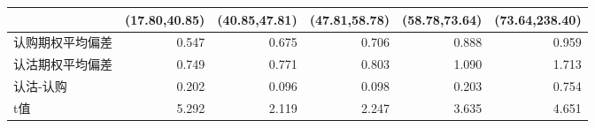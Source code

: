 \begin{tabularx}{\linewidth}{lrrrrr}
\toprule
{} &  (17.80,40.85) &  (40.85,47.81) &  (47.81,58.78) &  (58.78,73.64) &  (73.64,238.40) \\
\midrule
认购期权平均偏差 &  0.547 &  0.675 &  0.706 &  0.888 &  0.959 \\
认沽期权平均偏差 &  0.749 &  0.771 &  0.803 &  1.090 &  1.713 \\
认沽-认购    &  0.202 &  0.096 &  0.098 &  0.203 &  0.754 \\
t值       &  5.292 &  2.119 &  2.247 &  3.635 &  4.651 \\
\bottomrule
\end{tabularx}
